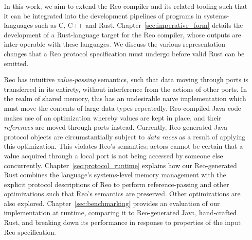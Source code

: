 
In this work, we aim to extend the Reo compiler and its related tooling such that it can be integrated into the development pipelines of programs in systems-languages such as C, C++ and Rust. Chapter~\ref{sec:imperative_form} details the development of a Rust-language target for the Reo compiler, whose outputs are inter-operable with these languages. We discuss the various representation changes that a Reo protocol specification must undergo before valid Rust can be emitted.

Reo has intuitive \textit{value-passing} semantics, such that data moving through ports is transferred in its entirety, without interference from the actions of other ports. In the realm of shared memory, this has an undesirable na\"ive implementation which must move the contents of large data-types repeatedly. Reo-compiled Java code makes use of an optimization whereby values are kept in place, and their \textit{references} are moved through ports instead. Currently, Reo-generated Java protocol objects are circumstantially subject to \textit{data races} as a result of applying this optimization. This violates Reo's semantics; actors cannot be certain that a value acquired through a local port is not being accessed by someone else concurrently. Chapter~\ref{sec:protocol_runtime} explains how our Reo-generated Rust combines the language's systems-level memory management with the explicit protocol descriptions of Reo to perform reference-passing and other optimizations such that Reo's semantics are preserved. Other 
optimizations are also explored. Chapter~\ref{sec:benchmarking} provides an evaluation of our implementation at runtime, comparing it to Reo-generated Java, hand-crafted Rust, and breaking down its performance in response to properties of the input Reo specification.

